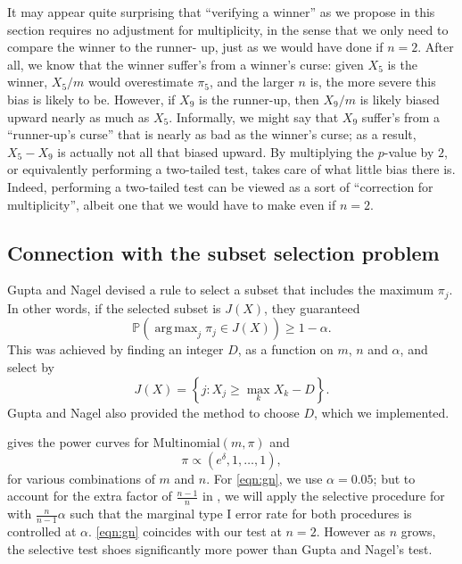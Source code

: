 \documentclass[11pt]{article}
\DeclareMathOperator*{\argmax}{arg\,max}
\newcommand{\PP}{\mathbb{P}}
\begin{document}
It may appear quite surprising that ``verifying a winner'' as we propose in this section requires no adjustment for multiplicity, in the sense that we only need to compare the winner to the runner- up, just as we would have done if $n = 2$. After all, we know that the winner suffer’s from a winner's curse: given $X_5$ is the winner, $X_5 / m$ would overestimate $\pi_5$, and the larger $n$ is, the more severe this bias is likely to be. However, if $X_9$ is the runner-up, then $X_9 / m$ is likely biased upward nearly as much as $X_5$. Informally, we might say that $X_9$ suffer’s from a “runner-up’s curse” that is nearly as bad as the winner's curse; as a result, $X_5 - X_9$ is actually not all that biased upward. By multiplying the $p$-value by $2$, or equivalently performing a two-tailed test, takes care of what little bias there is. Indeed, performing a two-tailed test can be viewed as a sort of ``correction for multiplicity'', albeit one that we would have to make even if $n = 2$.

\subsection{Connection with the subset selection problem}
\label{sec:compare_subset}

Gupta and Nagel \cite{Gupta:1967wg} devised a rule to select a subset that includes the maximum $\pi_j$. In other words, if the selected subset is $J\left(X\right)$, they guaranteed
$$\PP\left(\argmax_j \pi_j \in J\left(X\right)\right) \ge 1 - \alpha.$$
This was achieved by finding an integer $D$, as a function on $m$, $n$ and $\alpha$, and select by
\begin{equation}
J\left(X\right) = \left\{j: X_j \ge \max_k X_k - D\right\} \tag{Procedure GN}.
\label{eqn:gn}
\end{equation}
Gupta and Nagel also provided the method to choose $D$, which we implemented. 

 gives the power curves for $\text{Multinomial}\left(m, \pi\right)$ and
$$\pi \propto \left(e^\delta, 1, \ldots, 1\right),$$
for various combinations of $m$ and $n$. For \ref{eqn:gn}, we use $\alpha = 0.05$; but to account for the extra factor of $\frac{n-1}{n}$ in , we will apply the selective procedure for with $\frac{n}{n-1} \alpha$ such that the marginal type I error rate for both procedures is controlled at $\alpha$. \ref{eqn:gn} coincides with our test at $n = 2$. However as $n$ grows, the selective test shoes significantly more power than Gupta and Nagel's test.
\end{document}
